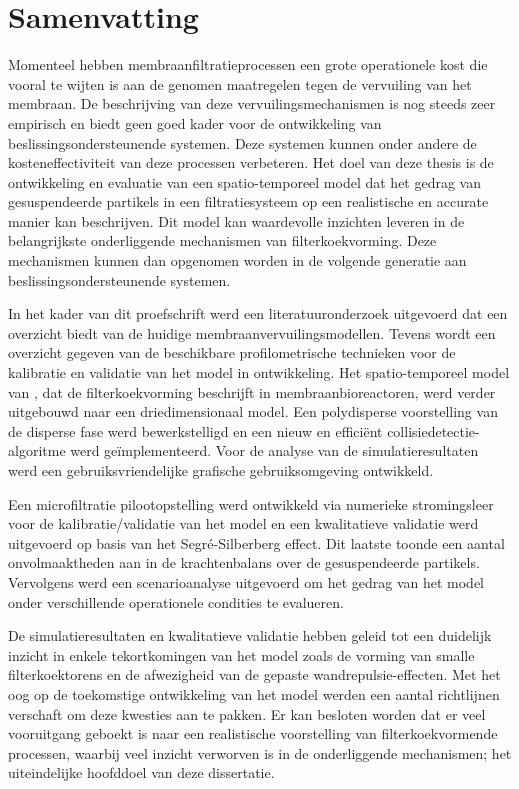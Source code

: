 \chapter[Samenvatting]%
{Samenvatting}
\vspace{-2cm}
Momenteel hebben membraanfiltratieprocessen een grote operationele kost die vooral te wijten is aan de genomen maatregelen tegen de vervuiling van het membraan. De beschrijving van deze vervuilingsmechanismen is nog steeds zeer empirisch en biedt geen goed kader voor de ontwikkeling van beslissingsondersteunende systemen. Deze systemen kunnen onder \mbox{andere} de kosteneffectiviteit van deze processen verbeteren. Het doel van deze thesis is de ontwikkeling en evaluatie van een spatio-temporeel model dat het gedrag van gesuspendeerde partikels in een filtratiesysteem op een realistische en accurate manier kan beschrijven. Dit model kan waardevolle inzichten leveren in de belangrijkste onderliggende mechanismen van filterkoekvorming. Deze mechanismen kunnen dan opgenomen worden in de volgende generatie aan beslissingsondersteunende systemen. \par
In het kader van dit proefschrift werd een literatuuronderzoek uitgevoerd dat een overzicht biedt van de huidige membraanvervuilingsmodellen. Tevens wordt een overzicht gegeven van de beschikbare profilometrische technieken voor de kalibratie en validatie van het model in ontwikkeling. Het spatio-temporeel model van \cite{Ghijs2014}, dat de filterkoekvorming beschrijft in membraanbioreactoren, werd verder uitgebouwd naar een driedimensionaal model. Een polydisperse voorstelling van de disperse fase werd bewerkstelligd en een nieuw en \mbox{effici\"ent} collisiedetectie-algoritme werd ge\"implementeerd. Voor de analyse van de simulatieresultaten werd een gebruiksvriendelijke grafische gebruiksomgeving ontwikkeld. \par
Een microfiltratie pilootopstelling  werd ontwikkeld via numerieke stromingsleer voor de kalibratie/validatie van het model en een kwalitatieve validatie werd uitgevoerd op basis van het Segr\'e-Silberberg effect. Dit laatste toonde een aantal onvolmaaktheden aan in de krachtenbalans over de gesuspendeerde partikels. Vervolgens werd een scenarioanalyse uitgevoerd om het gedrag van het model onder verschillende operationele condities te evalueren. \par
De simulatieresultaten en kwalitatieve validatie hebben geleid tot een duidelijk inzicht in enkele tekortkomingen van het model zoals de vorming van smalle filterkoektorens en de afwezigheid van de gepaste wandrepulsie-effecten. Met het oog op de toekomstige ontwikkeling van het model werden een aantal richtlijnen verschaft om deze kwesties aan te pakken. Er kan besloten worden dat er veel vooruitgang geboekt is naar een realistische voorstelling van filterkoekvormende processen, waarbij veel inzicht verworven is in de onderliggende mechanismen; het uiteindelijke hoofddoel van deze dissertatie.




